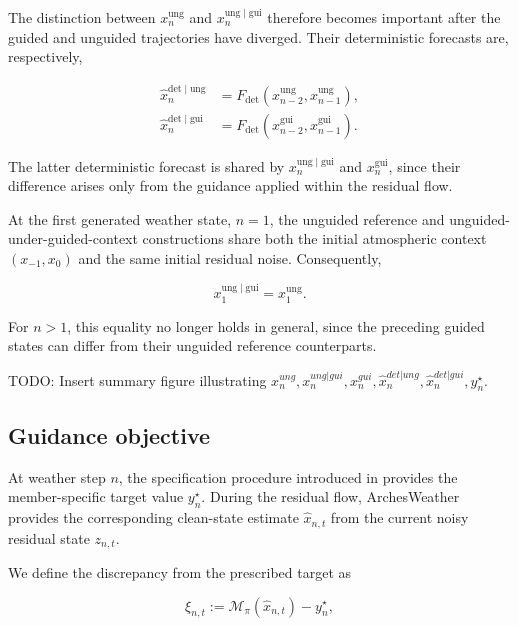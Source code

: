 The distinction between $x_n^{\mathrm{ung}}$ and
$x_n^{\mathrm{ung}\mid\mathrm{gui}}$ therefore becomes important after the
guided and unguided trajectories have diverged. Their deterministic forecasts
are, respectively,

\begin{align}
    \hat{x}_n^{\mathrm{det}\mid\mathrm{ung}}
    &=
    F_{\mathrm{det}}
    \left(
        x_{n-2}^{\mathrm{ung}},
        x_{n-1}^{\mathrm{ung}}
    \right),
    \\
    \hat{x}_n^{\mathrm{det}\mid\mathrm{gui}}
    &=
    F_{\mathrm{det}}
    \left(
        x_{n-2}^{\mathrm{gui}},
        x_{n-1}^{\mathrm{gui}}
    \right).
\end{align}

The latter deterministic forecast is shared by
$x_n^{\mathrm{ung}\mid\mathrm{gui}}$ and $x_n^{\mathrm{gui}}$, since their
difference arises only from the guidance applied within the residual flow.

At the first generated weather state, $n=1$, the unguided reference and
unguided-under-guided-context constructions share both the initial atmospheric
context $(x_{-1},x_0)$ and the same initial residual noise. Consequently,

\begin{equation}
    x_1^{\mathrm{ung}\mid\mathrm{gui}}
    =
    x_1^{\mathrm{ung}}.
    \label{eq:first-step-unguided-equivalence}
\end{equation}

For $n>1$, this equality no longer holds in general, since the preceding
guided states can differ from their unguided reference counterparts.

TODO: Insert summary figure illustrating
$x_n^{ung}, x_n^{ung|gui}, x_n^{gui},
\hat{x}_n^{det|ung}, \hat{x}_n^{det|gui}, y_n^\star.$

\subsection{Guidance objective}
\label{sec:guidance-objective}

At weather step $n$, the specification procedure introduced in
 provides the member-specific target value $y_n^\star$.
During the residual flow, ArchesWeather provides the corresponding
clean-state estimate $\hat{x}_{n,t}$ from the current noisy residual state
$z_{n,t}$.

We define the discrepancy from the prescribed target as

\begin{equation}
    \xi_{n,t}
    :=
    \mathcal{M}_\pi
    \left(
        \hat{x}_{n,t}
    \right)
    -
    y_n^\star,
    \label{eq:guidance-gap}
\end{equation}

